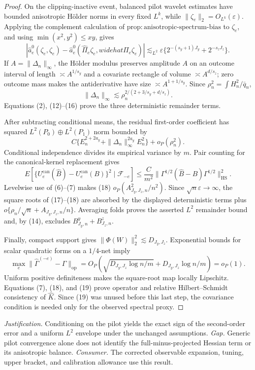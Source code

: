 \documentclass{article}
\begin{document}
\begin{proof}
On the clipping-inactive event, balanced pilot wavelet estimates have bounded anisotropic H\"older norms in every fixed \(L^k\), while \(\|\zeta_e\|_2=O_{L^k}(\varepsilon)\).  Applying the complement calculation of \(\mathrm{prop{:}anisotropic\text{-}spectrum\text{-}bias}\) to \(\zeta_e\), and using \(\min(x^2,y^2)\le xy\), gives
\[
|\widehat a_e^0(\zeta_e,\zeta_e)
-\widehat a_e^0(\widehat\Pi_e\zeta_e,widehat\Pi_e\zeta_e)|
\lesssim_{L^2}\varepsilon\{2^{-(s_y+1)J_y}+2^{-s_zJ_z}\}. \tag{15}
\]
If \(A=\|\Delta_n\|_\infty\), the H\"older modulus preserves amplitude \(A\) on an outcome interval of length \(\asymp A^{1/s_y}\) and a covariate rectangle of volume \(\asymp A^{d/s_z}\); zero outcome mass makes the antiderivative have size \(\asymp A^{1+1/s_y}\).  Since \(\rho_n^2=\int H_n^2/\bar q_n\),
\[
\|\Delta_n\|_\infty\lesssim
\rho_n^{2/(2+3/s_y+d/s_z)}. \tag{16}
\]
Equations (2), (12)--(16) prove the three deterministic remainder terms.

After subtracting conditional means, the residual first-order coefficient has squared \(L^2(P_0)\oplus L^2(P_1)\) norm bounded by
\[
C\{E_n^{2+2a_y}+\|\Delta_n\|_\infty^{2a_y}E_n^2\}+o_P(\rho_n^2). \tag{17}
\]
Conditional independence divides its empirical variance by \(m\).  Pair counting for the canonical-kernel replacement gives
\[
E[\{U_e^{\mathrm{can}}(\widehat B)-U_e^{\mathrm{can}}(B)\}^2\mid\mathscr F_{-e}]
\le\frac C{m^2}\|\Gamma^{1/2}(\widehat B-B)\Gamma^{1/2}\|_{\mathrm{HS}}^2. \tag{18}
\]
Levelwise use of (6)--(7) makes (18) \(o_P(A_{J_y,J_z,n}^2/n^2)\).  Since \(\sqrt n\varepsilon\to\infty\), the square roots of (17)--(18) are absorbed by the displayed deterministic terms plus \(o\{\rho_n/\sqrt n+A_{J_y,J_z,n}/n\}\).  Averaging folds proves the asserted \(L^2\) remainder bound and, by (14), excludes \(B^y_{J_y,n}+B^z_{J_z,n}\).

Finally, compact support gives \(\|\Phi(W)\|_2^2\lesssim D_{J_y,J_z}\).  Exponential bounds for scalar quadratic forms on a \(1/4\)-net imply
\[
\max_e\|\widehat\Gamma^{(-e)}-\Gamma\|_{\mathrm{op}}
=O_P\!\left(\sqrt{D_{J_y,J_z}\log n/m}+D_{J_y,J_z}\log n/m\right)=o_P(1). \tag{19}
\]
Uniform positive definiteness makes the square-root map locally Lipschitz.  Equations (7), (18), and (19) prove operator and relative Hilbert--Schmidt consistency of \(\widehat K\).  Since (19) was unused before this last step, the covariance condition is needed only for the observed spectral proxy.
\end{proof}
\par\smallskip\noindent \textit{Justification.} Conditioning on the pilot yields the exact sign of the second-order error and a uniform \(L^2\) envelope under the unchanged assumptions. \textit{Gap.} Generic pilot convergence alone does not identify the full-minus-projected Hessian term or its anisotropic balance. \textit{Consumer.} The corrected observable expansion, tuning, upper bracket, and calibration allowance use this result.
\end{document}
